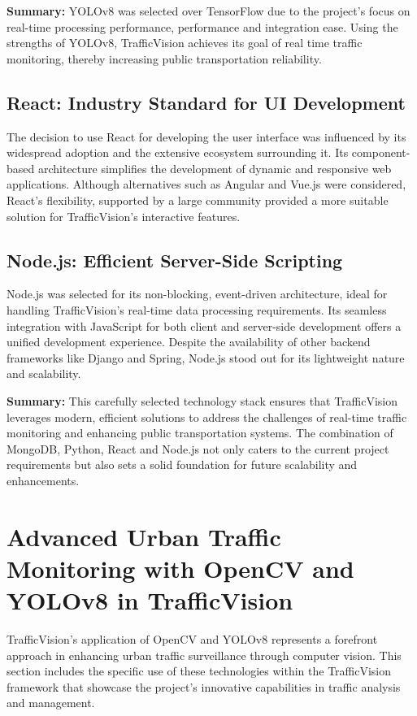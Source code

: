 \textbf{Summary:} YOLOv8 was selected over TensorFlow due to the project's focus on real-time processing performance, performance and integration ease. Using the strengths of YOLOv8, TrafficVision achieves its goal of real time traffic monitoring, thereby increasing public transportation reliability. 

\subsection{React: Industry Standard for UI Development} The decision to use React\cite{react2021} for developing the user interface was influenced by its widespread adoption and the extensive ecosystem surrounding it. Its component-based architecture simplifies the development of dynamic and responsive web applications. Although alternatives such as Angular and Vue.js were considered, React's flexibility, supported by a large community provided a more suitable solution for TrafficVision's interactive features. 

\subsection{Node.js: Efficient Server-Side Scripting} Node.js\cite{nodejs2024} was selected for its non-blocking, event-driven architecture, ideal for handling TrafficVision's real-time data processing requirements. Its seamless integration with JavaScript for both client and server-side development offers a unified development experience. Despite the availability of other backend frameworks like Django and Spring, Node.js stood out for its lightweight nature and scalability. 


\textbf{Summary:} This carefully selected technology stack ensures that TrafficVision leverages modern, efficient solutions to address the challenges of real-time traffic monitoring and enhancing public transportation systems. The combination of MongoDB, Python, React and Node.js not only caters to the current project requirements but also sets a solid foundation for future scalability and enhancements.


\section{Advanced Urban Traffic Monitoring with OpenCV and YOLOv8 in TrafficVision}
TrafficVision's application of OpenCV and YOLOv8 represents a forefront approach in enhancing urban traffic surveillance through computer vision. This section includes the specific use of these technologies within the TrafficVision framework that showcase the project's innovative capabilities in traffic analysis and management.

